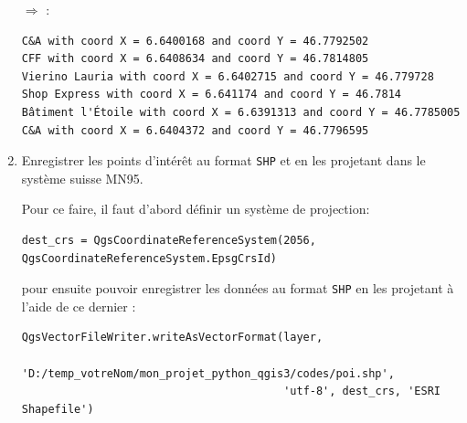 \documentclass[11pt]{article}
\begin{document}
\begin{enumerate}
$\Rightarrow$ \underline{}:
\vspace*{-1em}
\begin{center}
\begin{minipage}[t]{0.80\textwidth}
\begin{verbatim}
C&A with coord X = 6.6400168 and coord Y = 46.7792502
CFF with coord X = 6.6408634 and coord Y = 46.7814805
Vierino Lauria with coord X = 6.6402715 and coord Y = 46.779728
Shop Express with coord X = 6.641174 and coord Y = 46.7814
Bâtiment l'Étoile with coord X = 6.6391313 and coord Y = 46.7785005
C&A with coord X = 6.6404372 and coord Y = 46.7796595
\end{verbatim}
\end{minipage}
\end{center}
\vspace*{1em}






\item Enregistrer les points d'intérêt au format \texttt{SHP} et en les projetant dans le système suisse MN95.

Pour ce faire, il faut d'abord définir un système de projection:
\vspace*{-2em}
\begin{center}
\begin{minipage}[t]{0.98\textwidth}
\begin{verbatim}
dest_crs = QgsCoordinateReferenceSystem(2056, QgsCoordinateReferenceSystem.EpsgCrsId)
\end{verbatim}
\end{minipage}
\end{center}
\vspace*{1em}


pour ensuite pouvoir enregistrer les données au format \texttt{SHP} en les projetant à l'aide de ce dernier : 
\vspace*{-2em}
\begin{center}
\begin{minipage}[t]{1\textwidth}
\begin{verbatim}
QgsVectorFileWriter.writeAsVectorFormat(layer, 
                                        'D:/temp_votreNom/mon_projet_python_qgis3/codes/poi.shp', 
                                        'utf-8', dest_crs, 'ESRI Shapefile')
\end{verbatim}
\end{minipage}
\end{center}
\vspace*{1em}



\end{enumerate}
\end{document}
